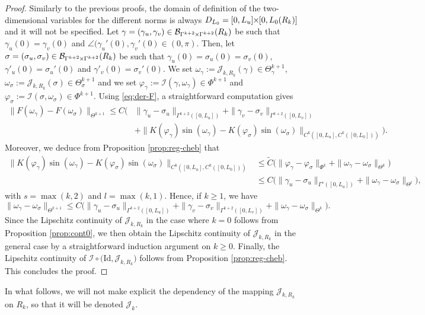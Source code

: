 \documentclass{article}
\newcommand{\I}{\mathcal{I}}
\newcommand{\PLH}{{\mkern-1mu\times\mkern-1mu}}
\newcommand{\Times}{\PLH}
\newcommand{\J}{\mathcal{J}}
\theoremstyle{remark}
\theoremstyle{prpart}
\newcommand{\B}{\mathcal{B}}
\newcommand{\Id}{\mathrm{Id}}
\begin{document}
\begin{proof}
  Similarly to the previous proofs, the domain of definition of the two-dimensional variables for the different norms is always $D_{L_0}=[0,L_u]\Times[0,L_0(R_k)]$ and it will not be specified. Let $\gamma=(\gamma_u,\gamma_v)\in \B_{\Gamma^{k+2}\Times \Gamma^{k+2}}(R_k)$ be such that $\gamma_u(0)=\gamma_v(0)$ and $\angle(\gamma_u'(0),\gamma_v'(0)\in(0,\pi)$. Then, let $\sigma=(\sigma_u,\sigma_v)\in \B_{\Gamma^{k+2}\Times \Gamma^{k+2}}(R_k)$ be such that $\gamma_u(0)=\sigma_u(0)=\sigma_v(0)$, $\gamma'_u(0)=\sigma_u'(0)$ and $\gamma'_v(0)=\sigma_v'(0)$. We set $\omega_\gamma:=\J_{k,R_k}(\gamma)\in\Theta_\gamma^{k+1}$, $\omega_\sigma:=\J_{k,R_k}(\sigma)\in\Theta_\sigma^{k+1}$ and we set $\varphi_\gamma:=\I(\gamma,\omega_\gamma)\in\Phi^{k+1}$ and $\varphi_\sigma:=\I(\sigma,\omega_\sigma)\in\Phi^{k+1}$. Using \eqref{eq:der-F}, a straightforward computation gives
  \begin{align*}
    \|F(\omega_\gamma) - F(\omega_\sigma)\|_{\Theta^{k+1}} \leq C\Big(&\|\gamma_u-\sigma_u\|_{\Gamma^{k+2}([0,L_u])} + \|\gamma_v-\sigma_v\|_{\Gamma^{k+2}([0,L_v])}\\
                                                                     &+ \|K(\varphi_\gamma)\sin(\omega_\gamma) - K(\varphi_\sigma)\sin(\omega_\sigma)\|_{C^{k}([0,L_u],C^k([0,L_0]))}\Big).
  \end{align*}
  Moreover, we deduce from Proposition \ref{prop:reg-cheb} that
  \begin{align*}
    \|K(\varphi_\gamma)\sin(\omega_\gamma) - K(\varphi_\sigma)\sin(\omega_\sigma)\|_{C^{k}([0,L_u],C^k([0,L_0]))}
    &\leq \tilde C\Big(\|\varphi_\gamma-\varphi_\sigma\|_{\Phi^{k}} + \|\omega_\gamma-\omega_\sigma\|_{\Theta^{k}}\Big)\\
    &\leq C\Big( \|\gamma_u-\sigma_u\|_{\Gamma^{s}([0,L_u])} + \|\omega_\gamma-\omega_\sigma\|_{\Theta^{l}}\Big),
  \end{align*}
  with $s=\max(k,2)$ and $l=\max(k,1)$. Hence, if $k\geq1$, we have
  \begin{equation*}
    \|\omega_\gamma - \omega_\sigma\|_{\Theta^{k+1}} \leq C\Big(\|\gamma_u-\sigma_u\|_{\Gamma^{k+2}([0,L_u])} + \|\gamma_v-\sigma_v\|_{\Gamma^{k+2}([0,L_v])} + \|\omega_\gamma-\omega_\sigma\|_{\Theta^{k}}\Big).
  \end{equation*}
  Since the Lipschitz continuity of $\J_{k,R_k}$ in the case where $k=0$ follows from Proposition \ref{prop:cont0}, we then obtain the Lipschitz continuity of $\J_{k,R_k}$ in the general case by a straightforward induction argument on $k\geq0$. Finally, the Lipschitz continuity of $\I\circ \big(\Id,\J_{k,R_k}\big)$ follows from Proposition \ref{prop:reg-cheb}.
  This concludes the proof.
\end{proof}
In what follows, we will not make explicit the dependency of the mapping $\J_{k,R_k}$ on $R_k$, so that it will be denoted $\J_k$.
\end{document}
